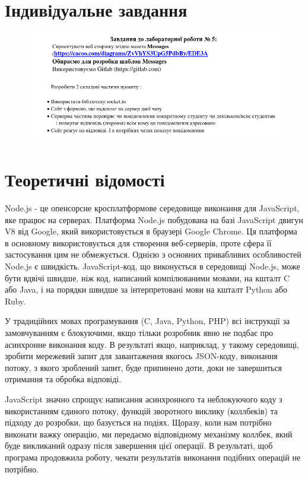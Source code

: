 \documentclass{article}
\begin{document}
\begin{normalsize}
\section*{Індивідуальне завдання}

\begin{figure}[H]
	\centering
	\includegraphics[width=\textwidth]{v}
\end{figure}


\section*{Теоретичні відомості}
Node.js - це опенсорсне кросплатформове середовище виконання для JavaScript, яке
працює на серверах.
Платформа Node.js побудована на базі JavaScript двигун V8 від Google, який
використовується в браузері Google Chrome. Ця платформа в основному використовується
для створення веб-серверів, проте сфера її застосування цим не обмежується.
Однією з основних привабливих особливостей Node.js є швидкість. JavaScript-код,
що виконується в середовищі Node.js, може бути вдвічі швидше, ніж код, написаний
компілюваними мовами, на кшталт C або Java, і на порядки швидше за інтерпретовані
мови на кшталт Python або Ruby.

У традиційних мовах програмування (C, Java, Python, PHP) всі інструкції за
замовчуванням є блокуючими, якщо тільки розробник явно не подбає про асинхронне
виконання коду. В результаті якщо, наприклад, у такому середовищі, зробити мережевий
запит для завантаження якогось JSON-коду, виконання потоку, з якого зроблений запит,
буде припинено доти, доки не завершиться отримання та обробка відповіді.

JavaScript значно спрощує написання асинхронного та неблокуючого коду з
використанням єдиного потоку, функцій зворотного виклику (коллбеків) та підходу до
розробки, що базується на подіях. Щоразу, коли нам потрібно виконати важку операцію,
ми передаємо відповідному механізму коллбек, який буде викликаний одразу після
завершення цієї операції. В результаті, щоб програма продовжила роботу, чекати
результатів виконання подібних операцій не потрібно.


\end{normalsize}
\end{document}
